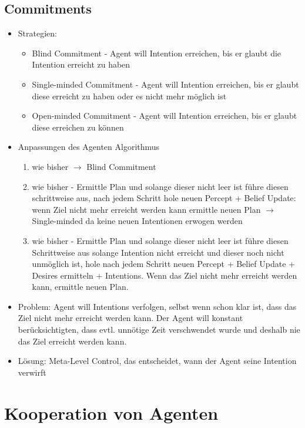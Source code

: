 \documentclass{article} %
\begin{document}
	\subsection{Commitments}
	\begin{itemize}
		\item Strategien:
		\begin{itemize}
			\item Blind Commitment - Agent will Intention erreichen, bis er glaubt die Intention erreicht zu haben
			\item Single-minded Commitment - Agent will Intention erreichen, bis er glaubt diese erreicht zu haben oder es nicht mehr möglich ist
			\item Open-minded Commitment - Agent will Intention erreichen, bis er glaubt diese erreichen zu können
		\end{itemize}
		\item Anpassungen des Agenten Algorithmus
		\begin{enumerate}
			\item wie bisher $\rightarrow$ Blind Commitment
			\item wie bisher - Ermittle Plan und solange dieser nicht leer ist führe diesen schrittweise aus, nach jedem Schritt hole neuen Percept + Belief Update: wenn Ziel nicht mehr erreicht werden kann ermittle neuen Plan $\rightarrow$ Single-minded da keine neuen Intentionen erwogen werden
			\item wie bisher - Ermittle Plan und solange dieser nicht leer ist führe diesen Schrittweise aus solange Intention nicht erreicht und dieser noch nicht unmöglich ist, hole nach jedem Schritt neuen Percept + Belief Update + Desires ermitteln + Intentions. Wenn das Ziel nicht mehr erreicht werden kann, ermittle neuen Plan.
		\end{enumerate}
		\item Problem: Agent will Intentions verfolgen, selbst wenn schon klar ist, dass das Ziel nicht mehr erreicht werden kann. Der Agent will konstant berücksichtigten, dass evtl. unnötige Zeit verschwendet wurde und deshalb nie das Ziel erreicht werden kann.
		\item Lösung: Meta-Level Control, das entscheidet, wann der Agent seine Intention verwirft
	\end{itemize}
\section{Kooperation von Agenten}
\end{document}
